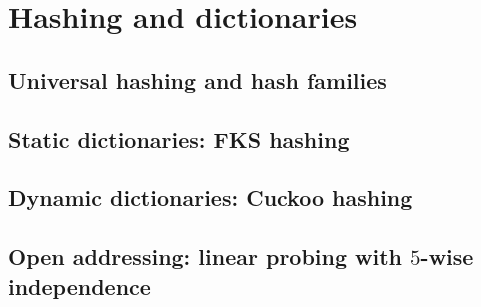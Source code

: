 \chapter{Hashing and dictionaries}

\section{Universal hashing and hash families}

\section{Static dictionaries: FKS hashing}

\section{Dynamic dictionaries: Cuckoo hashing}

\section{Open addressing: linear probing with $5$-wise independence}


